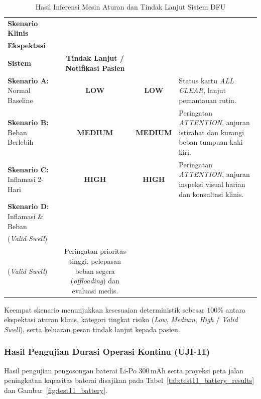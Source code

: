 \begin{table}[htbp]
\centering
\caption{Hasil Inferensi Mesin Aturan dan Tindak Lanjut Sistem DFU}
\label{tab:test12_clinical_output}
\small
\setlength{\tabcolsep}{5pt}
\begin{tabular}{|p{2.8cm}|c|c|p{5.5cm}|}
\hline
\textbf{Skenario Klinis} & \shortstack{\textbf{Kategori} \\ \textbf{Ekspektasi}} & \shortstack{\textbf{Keluaran} \\ \textbf{Sistem}} & \textbf{Tindak Lanjut / Notifikasi Pasien} \\ \hline
\textbf{Skenario A:} \newline Normal Baseline & \textbf{LOW} & \textbf{LOW} & Status kartu \textit{ALL CLEAR}, lanjut pemantauan rutin. \\ \hline
\textbf{Skenario B:} \newline Beban Berlebih & \textbf{MEDIUM} & \textbf{MEDIUM} & Peringatan \textit{ATTENTION}, anjuran istirahat dan kurangi beban tumpuan kaki kiri. \\ \hline
\textbf{Skenario C:} \newline Inflamasi 2-Hari & \textbf{HIGH} & \textbf{HIGH} & Peringatan \textit{ATTENTION}, anjuran inspeksi visual harian dan konsultasi klinis. \\ \hline
\textbf{Skenario D:} \newline Inflamasi \& Beban & \shortstack{\textbf{HIGH} \\ (\textit{Valid Swell})} & \shortstack{\textbf{HIGH} \\ (\textit{Valid Swell})} & Peringatan prioritas tinggi, pelepasan beban segera (\textit{offloading}) dan evaluasi medis. \\ \hline
\end{tabular}
\end{table}

Keempat skenario menunjukkan kesesuaian deterministik sebesar $100\%$ antara ekspektasi aturan klinis, kategori tingkat risiko (\textit{Low}, \textit{Medium}, \textit{High} / \textit{Valid Swell}), serta keluaran pesan tindak lanjut kepada pasien.

\subsubsection{Hasil Pengujian Durasi Operasi Kontinu (UJI-11)}
Hasil pengujian pengosongan baterai Li-Po 300\,mAh serta proyeksi peta jalan peningkatan kapasitas baterai disajikan pada Tabel~\ref{tab:test11_battery_results} dan Gambar~\ref{fig:test11_battery}.

